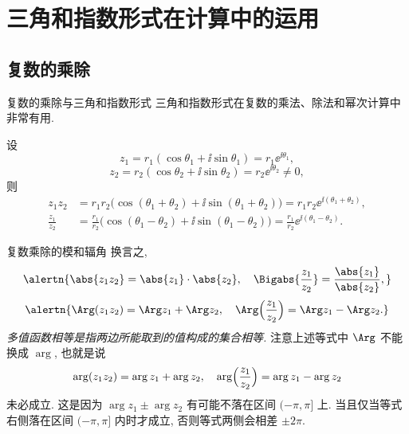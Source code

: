 \section{三角和指数形式在计算中的运用}

\subsection{复数的乘除}

\begin{frame}{复数的乘除与三角和指数形式}
	\onslide<+->
	三角和指数形式在复数的乘法、除法和幂次计算中非常有用.
	\onslide<+->
	\begin{theorem}
		设
		\[
			z_1=r_1(\cos\theta_1+\ii\sin\theta_1)=r_1\ee^{\ii\theta_1},
		\]
		\[
			z_2=r_2(\cos\theta_2+\ii\sin\theta_2)=r_2\ee^{\ii\theta_2}\neq 0,
		\]
		则
		\begin{align*}
			z_1z_2&
			=r_1r_2\bigl(\cos(\theta_1+\theta_2)+\ii\sin(\theta_1+\theta_2)\bigr)
			=r_1r_2\ee^{\ii(\theta_1+\theta_2)},\\
			\frac{z_1}{z_2}&
			=\frac{r_1}{r_2}\bigl(\cos(\theta_1-\theta_2)+\ii\sin(\theta_1-\theta_2)\bigr)
			=\frac{r_1}{r_2}\ee^{\ii(\theta_1-\theta_2)}.
		\end{align*}
	\end{theorem}
\end{frame}


\begin{frame}{复数乘除的模和辐角}
	\onslide<+->
	换言之,
	\[
		\alertn{\abs{z_1z_2}=\abs{z_1}\cdot\abs{z_2},\quad\Bigabs{\frac{z_1}{z_2}}=\frac{\abs{z_1}}{\abs{z_2}},}
	\]
	\onslide<+->
	\[
		\alertn{\Arg(z_1z_2)=\Arg z_1+\Arg z_2,\quad
		\Arg\Bigl(\frac{z_1}{z_2}\Bigr)=\Arg z_1-\Arg z_2.}
	\]
	\onslide<+->
	\emph{多值函数相等是指两边所能取到的值构成的集合相等.}
	\onslide<+->
	注意上述等式中 $\Arg$ 不能换成 $\arg$,
	\onslide<+->
	也就是说
	\[
		\arg(z_1z_2)=\arg z_1+\arg z_2,\quad
		\arg\Bigl(\frac{z_1}{z_2}\Bigr)=\arg z_1-\arg z_2
	\]
	\alert{未必成立}.
	\onslide<+->
	这是因为 $\arg z_1\pm\arg z_2$ 有可能不落在区间 $(-\pi,\pi]$ 上.
	\onslide<+->
	当且仅当等式右侧落在区间 $(-\pi,\pi]$ 内时才成立, 否则等式两侧会相差 $\pm2\pi$.
\end{frame}


